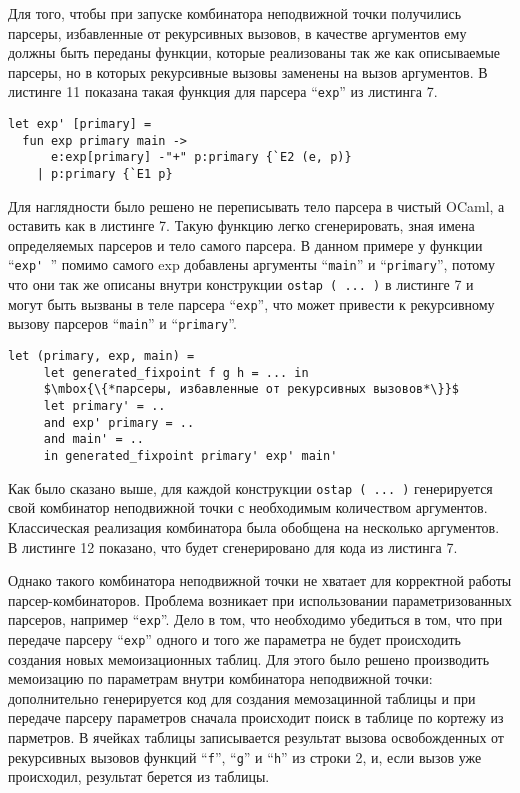 Для того, чтобы при запуске комбинатора неподвижной точки получились парсеры, избавленные от рекурсивных вызовов, в качестве аргументов ему должны быть переданы функции, которые реализованы так же как описываемые парсеры, но в которых рекурсивные вызовы заменены на вызов аргументов. В листинге 11 показана такая функция для парсера ``\lstinline|exp|'' из листинга 7.

\begin{lstlisting}[basicstyle=\small, caption=Парсеры без рекурсивных вызовов]
let exp' [primary] =
  fun exp primary main ->
      e:exp[primary] -"+" p:primary {`E2 (e, p)}
    | p:primary {`E1 p}
\end{lstlisting}

Для наглядности было решено не переписывать тело парсера в чистый OCaml, а оставить как в листинге 7. Такую функцию легко сгенерировать, зная имена определяемых парсеров и тело самого парсера. В данном примере у функции ``\lstinline|exp' |'' помимо самого exp добавлены аргументы ``\lstinline|main|'' и ``\lstinline|primary|'', потому что они так же описаны внутри конструкции \lstinline|ostap ( ... )| в листинге 7 и могут быть вызваны в теле парсера ``\lstinline|exp|'', что может привести к рекурсивному вызову парсеров ``\lstinline|main|'' и ``\lstinline|primary|''.

\begin{lstlisting}[basicstyle=\small, caption=Код комбинатора неподвижной точки]
   let (primary, exp, main) =
     let generated_fixpoint f g h = ... in
     $\mbox{\{*парсеры, избавленные от рекурсивных вызовов*\}}$
     let primary' = ..
     and exp' primary = ..
     and main' = ..
     in generated_fixpoint primary' exp' main'
\end{lstlisting}

Как было сказано выше, для каждой конструкции \lstinline|ostap ( ... )| генерируется свой комбинатор неподвижной точки с необходимым количеством аргументов. Классическая реализация комбинатора была обобщена на несколько аргументов. В листинге 12 показано, что будет сгенерировано для кода из листинга 7.

Однако такого  комбинатора неподвижной точки не хватает для корректной работы парсер-комбинаторов. Проблема возникает при использовании параметризованных парсеров, например ``\lstinline|exp|''. Дело в том, что необходимо убедиться в том, что при передаче парсеру ``\lstinline|exp|'' одного и того же параметра не будет происходить создания новых мемоизационных таблиц. Для этого было решено производить мемоизацию по параметрам внутри комбинатора неподвижной точки: дополнительно генерируется код для создания мемозацинной таблицы и при передаче парсеру параметров сначала происходит поиск в таблице по кортежу из парметров. В ячейках таблицы записывается результат вызова освобожденных от рекурсивных вызовов функций ``\lstinline|f|'', ``\lstinline|g|'' и ``\lstinline|h|'' из строки 2, и, если вызов уже происходил, результат берется из таблицы.

